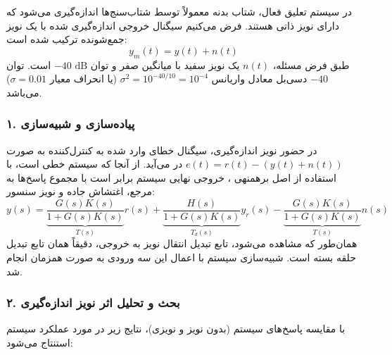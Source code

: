 \documentclass[a4paper]{article}
\begin{document}
در سیستم تعلیق فعال، شتاب بدنه معمولاً توسط شتاب‌سنج‌ها اندازه‌گیری می‌شود که دارای نویز ذاتی هستند. فرض می‌کنیم سیگنال خروجی اندازه‌گیری شده  با یک نویز جمع‌شونده  ترکیب شده است:
\begin{equation}
	y_m(t) = y(t) + n(t)
\end{equation}
طبق فرض مسئله، $n(t)$ یک نویز سفید با میانگین صفر  و توان $-40\text{ dB}$ است. توان $-40$ دسی‌بل معادل واریانس $\sigma^2 = 10^{-40/10} = 10^{-4}$ (یا انحراف معیار $\sigma = 0.01$) می‌باشد.

\subsubsection*{۱. پیاده‌سازی و شبیه‌سازی}
در حضور نویز اندازه‌گیری، سیگنال خطای وارد شده به کنترل‌کننده به صورت $e(t) = r(t) - (y(t) + n(t))$ در می‌آید. از آنجا که سیستم خطی است، با استفاده از اصل برهمنهی ، خروجی نهایی سیستم برابر است با مجموع پاسخ‌ها به مرجع، اغتشاش جاده و نویز سنسور:
\begin{equation}
	y(s) = \underbrace{\frac{G(s)K(s)}{1+G(s)K(s)}}_{T(s)} r(s) + \underbrace{\frac{H(s)}{1+G(s)K(s)}}_{T_d(s)} y_r(s) - \underbrace{\frac{G(s)K(s)}{1+G(s)K(s)}}_{T(s)} n(s)
\end{equation}
همان‌طور که مشاهده می‌شود، تابع تبدیل انتقال نویز به خروجی، دقیقاً همان تابع تبدیل حلقه بسته  است. شبیه‌سازی سیستم با اعمال این سه ورودی به صورت همزمان انجام شد.


\subsubsection*{۲. بحث و تحلیل اثر نویز اندازه‌گیری}
با مقایسه پاسخ‌های سیستم (بدون نویز و نویزی)، نتایج زیر در مورد عملکرد سیستم استنتاج می‌شود:
\end{document}
